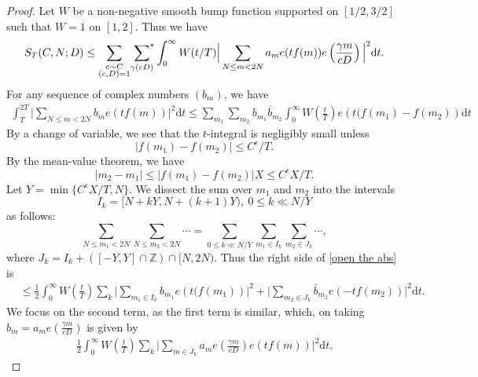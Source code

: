 \documentclass[10pt,a4paper]{amsart}
\newcommand{\sumstar}{\sideset{}{^*}\sum}
\begin{document}
\begin{proof}
Let $W$ be a non-negative smooth bump  function supported on $[1/2,3/2]$ such that $W=1$ on $[1,2]$. Thus we have 
  \begin{align*}
   S_T(C,N;D) \leq  \mathop{\sum_{\substack{c \sim C \\ (c,D)=1}}}\sumstar_{\gamma (cD)} \int_{0}^{\infty}W(t/T) \Big|\sum_{N \leq m <  2N} a_m  e(tf(m)) e\left( \frac{\gamma m}{cD} \right) \Big| ^2\mathrm{d}t.
\end{align*}
For any sequence of complex numbers $(b_m)$, we have 
\begin{align}\label{open the abs}
    \int_{T}^{2T } \Big|\sum_{N \leq m <  2N} b_m  e(tf(m))  \Big| ^2\mathrm{d}t \leq  \sum_{m_1}  \sum_{m_2}b_{m_1} \overline{b}_{m_2} \int_{0}^{\infty} W\left( \frac{t}{T} \right) e\left( t(f(m_1)-f(m_2) \right)  \mathrm{d}t 
\end{align}
 By a change of variable, we see that the $t$-integral is negligibly small unless $$ |f(m_1)-f(m_2)| \leq C^{\epsilon}/T. $$ 
 By the mean-value theorem, we have
 \[|m_2-m_1| \leq {|f(m_1)-f(m_2)|X} \leq {C^\epsilon X}/{T}.\]
Let $Y=\min\{C^\epsilon X/T,N \}$. We dissect the sum over $m_1$ and $m_2$ into the intervals $$I_k=[N+kY,N+(k+1)Y), \ 0 \leq k \ll N/Y $$   as follows:
\[    \sum_{N \leq m_1<2N}  \sum_{N \leq m_2 <2N}\cdots = \sum_{0\leq k\ll N/Y}\sum_{m_1 \in I_k} \sum_{m_2 \in J_k} \cdots,\]
where $J_k=I_k+([-Y,Y]\cap \mathbb{Z})\cap [N,2N).$
Thus the right side of \eqref{open the abs} is 
\begin{align*}
   &\leq \frac{1}{2} \int_{0}^{\infty} W\left( \frac{t}{T} \right) \sum_k \Big| \sum_{m_1 \in I_k} b_{m_1} e\left( t(f(m_1) \right) \Big|^2+\Big|\sum_{m_2 \in J_k} \bar{b}_{m_2} e\left( -tf(m_2) \right) \Big|^2\mathrm{d}t.
     \end{align*}
We focus on the second term, as the first term is similar, which, on taking  $b_m=a_m e\left(\frac{\gamma m}{cD}\right)$ is given by 
\begin{align*}
    \frac{1}{2} \int_{0}^{\infty} W\left( \frac{t}{T} \right) \sum_k \Big|\sum_{m \in J_k} a_m e\left(\frac{\gamma m}{cD}\right) e\left( tf(m) \right) \Big|^2\mathrm{d}t.

\end{align*}
\end{proof}
\end{document}
